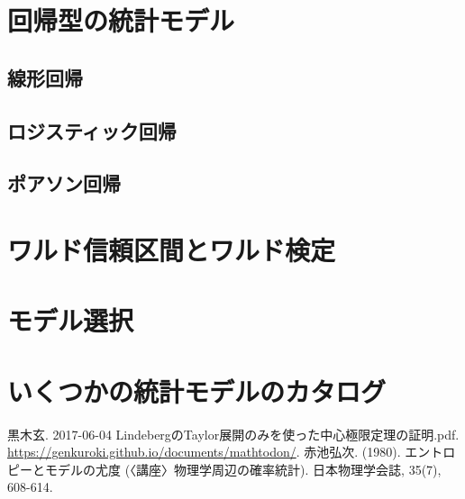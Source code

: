 \documentclass{jarticle}
\begin{document}
\section{回帰型の統計モデル}
\subsection{線形回帰}
\subsection{ロジスティック回帰}
\subsection{ポアソン回帰}

\section{ワルド信頼区間とワルド検定}

\section{モデル選択}

\section{いくつかの統計モデルのカタログ}

\begin{thebibliography}{1}
黒木玄. 2017-06-04 LindebergのTaylor展開のみを使った中心極限定理の証明.pdf. \url{https://genkuroki.github.io/documents/mathtodon/}.
 赤池弘次. (1980). エントロピーとモデルの尤度 (〈講座〉物理学周辺の確率統計). 日本物理学会誌, 35(7), 608-614.
\end{thebibliography}
\end{document}
